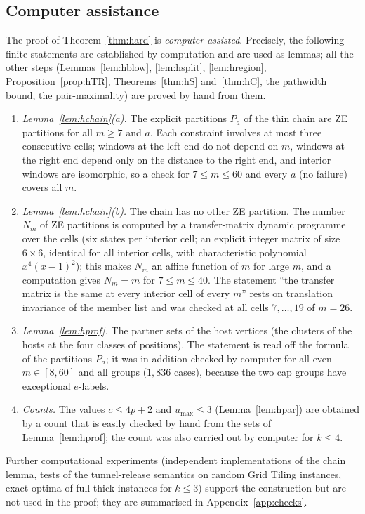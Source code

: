\subsection{Computer assistance}\label{sec:hardcomp}
The proof of Theorem~\ref{thm:hard} is \emph{computer-assisted}. Precisely, the following finite statements are established by computation and are used as lemmas; all the other steps (Lemmas~\ref{lem:hblow}, \ref{lem:hsplit}, \ref{lem:hregion}, Proposition~\ref{prop:hTR}, Theorems~\ref{thm:hS} and~\ref{thm:hC}, the pathwidth bound, the pair-maximality) are proved by hand from them.
\begin{enumerate}
\item[(CA1)] \emph{Lemma~\ref{lem:hchain}(a).} The explicit partitions $P_a$ of the thin chain are ZE partitions for all $m\ge7$ and $a$. Each constraint involves at most three consecutive cells; windows at the left end do not depend on $m$, windows at the right end depend only on the distance to the right end, and interior windows are isomorphic, so a check for $7\le m\le60$ and every $a$ (no failure) covers all $m$.
\item[(CA2)] \emph{Lemma~\ref{lem:hchain}(b).} The chain has no other ZE partition. The number $N_m$ of ZE partitions is computed by a transfer-matrix dynamic programme over the cells (six states per interior cell; an explicit integer matrix of size $6\times6$, identical for all interior cells, with characteristic polynomial $x^4(x-1)^2$); this makes $N_m$ an affine function of $m$ for large $m$, and a computation gives $N_m=m$ for $7\le m\le40$. The statement ``the transfer matrix is the same at every interior cell of every $m$'' rests on translation invariance of the member list and was checked at all cells $7,\dots,19$ of $m=26$.
\item[(CA3)] \emph{Lemma~\ref{lem:hprof}.} The partner sets of the host vertices (the clusters of the hosts at the four classes of positions). The statement is read off the formula of the partitions $P_a$; it was in addition checked by computer for all even $m\in[8,60]$ and all groups ($1{,}836$ cases), because the two cap groups have exceptional $e$-labels.
\item[(CA4)] \emph{Counts.} The values $c\le4p+2$ and $u_{\max}\le3$ (Lemma~\ref{lem:hpar}) are obtained by a count that is easily checked by hand from the sets of Lemma~\ref{lem:hprof}; the count was also carried out by computer for $k\le4$.
\end{enumerate}
Further computational experiments (independent implementations of the chain lemma, tests of the tunnel-release semantics on random Grid Tiling instances, exact optima of full thick instances for $k\le3$) support the construction but are not used in the proof; they are summarised in Appendix~\ref{app:checks}.

